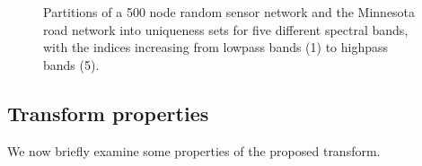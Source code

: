 \documentclass[journal, 10pt]{IEEEtran}
\begin{document}
\begin{figure}[tb]
\begin{minipage}[m]{0.46\linewidth}
\end{minipage}
\caption{Partitions of a 500 node random sensor network and the Minnesota road network \cite{gleich} into uniqueness sets for five different spectral bands, with the indices increasing from lowpass bands (1) to highpass bands (5).} \label{Fig:part_examples}
\end{figure} 


\subsection{Transform properties}
We now briefly examine some properties of the proposed transform. 
\end{document}
